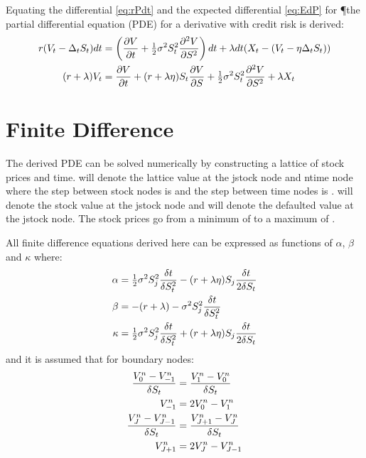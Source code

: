 \documentclass[a4paper,11pt,oneside]{report}
\theoremstyle{plain}
\theoremstyle{definition}
\begin{document}
Equating the differential \eqref{eq:rPdt} and the expected differential \eqref{eq:EdP} for \P the partial differential equation (PDE) for a derivative with credit risk is derived:
\begin{align}
 r(V_t - \Delta_tS_t)dt &= \left(\frac{\partial V}{\partial t} + \tfrac{1}{2}\sigma^2S_t^2\frac{\partial^2 V}{\partial S^2}\right)dt + \lambda dt(X_t - (V_t - \eta\Delta_tS_t)) \nonumber\\
 (r + \lambda)V_t &= \frac{\partial V}{\partial t} + (r + \lambda\eta)S_t\frac{\partial V}{\partial S} + \tfrac{1}{2}\sigma^2S_t^2\frac{\partial^2 V}{\partial S^2} + \lambda X_t
\end{align}


\section{Finite Difference}
The derived PDE can be solved numerically by constructing a lattice of stock prices and time.  \Vjn will denote the lattice value at the j\th stock node and n\th time node where the step between stock nodes is \DS and the step between time nodes is \Dt.  \Sj will denote the stock value at the j\th stock node and \Xj will denote the defaulted value at the j\th stock node.  The stock prices go from a minimum of \Sz to a maximum of \SJ.

All finite difference equations derived here can be expressed as functions of $\alpha$, $\beta$ and $\kappa$ where:
\begin{align*}
 \alpha &= \tfrac{1}{2}\sigma^2S_j^2\frac{\delta t}{\delta S_t^2} - (r + \lambda\eta)S_j\frac{\delta t}{2\delta S_t} \\
 \beta  &= - (r + \lambda) - \sigma^2S_j^2\frac{\delta t}{\delta S_t^2} \\
 \kappa &= \tfrac{1}{2}\sigma^2S_j^2\frac{\delta t}{\delta S_t^2} + (r + \lambda\eta)S_j\frac{\delta t}{2\delta S_t} \\
\end{align*}
and it is assumed that for boundary nodes:
\begin{align*}
 \frac{V^{n}_{0} - V^{n}_{-1}}{\delta S_t} &= \frac{V^{n}_{1} - V^{n}_{0}}{\delta S_t} \\
                    V^{n}_{-1} &= 2V^{n}_{0} - V^{n}_{1} \\
 \frac{V^{n}_{J} - V^{n}_{J - 1}}{\delta S_t} &= \frac{V^{n}_{J + 1} - V^{n}_{J}}{\delta S_t} \\
                    V^{n}_{J + 1} &= 2V^{n}_{J} - V^{n}_{J - 1} \\
\end{align*}

\end{document}
